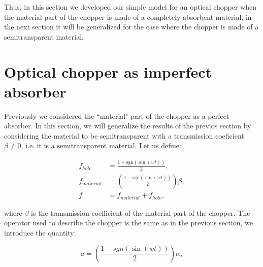 \documentclass[12pt]{book}
\begin{document}
Thus, in this section we developed our simple model for an optical chopper when the material part of the chopper is made of a completely absorbent material, in the next section it will be generalized for the case where the chopper is made of a semitransparent material.

\section{Optical chopper as imperfect absorber}

Previously we considered the ``material" part of the chopper as a perfect absorber. In this section,  we will generalize the results of the previos section by considering the material to be semitransparent with a transmission coeficient $\beta \neq 0$, i.e. it is a semitransparent material. Let us define: 
 

\begin{align}
f_{hole}&=\frac{1+\mathrm{sgn}(\sin(wt))}{2},\\
f_{material}&=\left(\frac{1-\mathrm{sgn}(\sin(wt))}{2} \right)\beta,\\
f&=f_{material}+f_{hole},
\end{align}


where $\beta$ is the transmission coefficient of the material part of the chopper. The operator used to describe the chopper is the same as in the previous section, we introduce the quantity:


\begin{equation}
a=\left(\frac{1-sgn(\sin(wt))}{2}\right) \alpha,
\end{equation}
\end{document}
